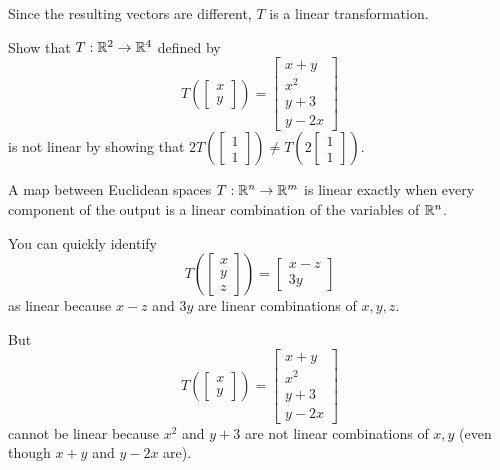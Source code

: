 \begin{applicationActivities}
\begin{example}
Since the resulting vectors are different,
\(T\) is a linear transformation.
\end{example}

\begin{activity}{5}
Show that \(T : \mathbb{R}^2 \rightarrow \mathbb{R}^4\) defined by
\[
  T\left(\begin{bmatrix} x \\ y \end{bmatrix} \right)
=
  \begin{bmatrix} x+y \\ x^2 \\ y+3 \\ y-2x \end{bmatrix}
\]
is not linear by showing that
\(
  2T\left(\begin{bmatrix} 1 \\ 1 \end{bmatrix} \right)
\not=
  T\left(2\begin{bmatrix} 1 \\ 1 \end{bmatrix} \right)
\).
\end{activity}

\begin{fact}
A map between Euclidean spaces \(T:\mathbb{R}^n\to\mathbb{R}^m\) is linear
exactly when every component of the output is a linear combination
of the variables of \(\mathbb{R}^n\).
\end{fact}

\begin{example}
You can quickly identify
\[
  T\left(\begin{bmatrix} x \\ y \\ z \end{bmatrix} \right)
=
  \begin{bmatrix} x-z \\ 3y \end{bmatrix}
\]
as linear because \(x-z\) and \(3y\) are linear combinations
of \(x,y,z\).

But
\[
  T\left(\begin{bmatrix} x \\ y \end{bmatrix} \right)
=
  \begin{bmatrix} x+y \\ x^2 \\ y+3 \\ y-2x \end{bmatrix}
\]
cannot be linear because \(x^2\) and \(y+3\) are not linear
combinations of \(x,y\) (even though \(x+y\) and \(y-2x\) are).
\end{example}


\end{applicationActivities}
